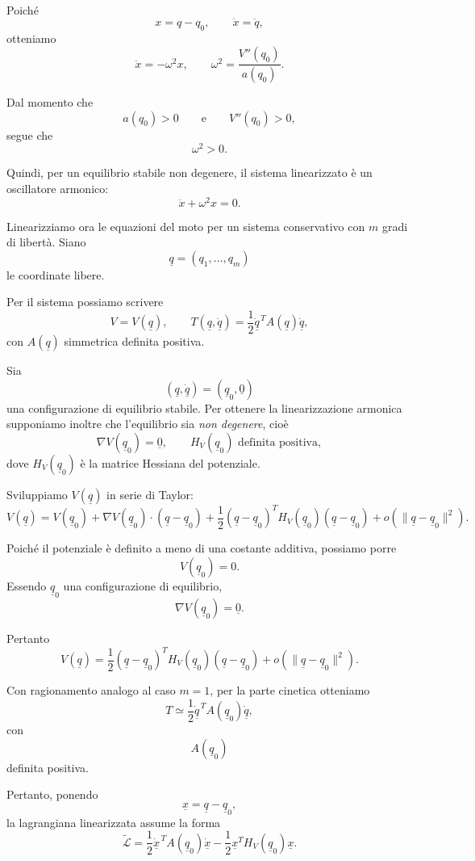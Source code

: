 Poiché
\[
x=q-q_0,
\qquad
\ddot x=\ddot q,
\]
otteniamo
\[
\ddot x=-\omega^2x,
\qquad
\omega^2=\frac{V''(q_0)}{a(q_0)}.
\]

Dal momento che
\[
a(q_0)>0
\qquad\text{e}\qquad
V''(q_0)>0,
\]
segue che
\[
\omega^2>0.
\]

Quindi, per un equilibrio stabile non degenere, il sistema linearizzato è un oscillatore armonico:
\[
\ddot x+\omega^2x=0.
\]

Linearizziamo ora le equazioni del moto per un sistema conservativo con \(m\) gradi di libertà. Siano
\[
\underline q=(q_1,\ldots,q_m)
\]
le coordinate libere.

Per il sistema possiamo scrivere
\[
V=V(\underline q),
\qquad
T(\underline q,\dot{\underline q})
=
\frac{1}{2}
\dot{\underline q}^{\,T}
A(\underline q)
\dot{\underline q},
\]
con \(A(\underline q)\) simmetrica definita positiva.

Sia
\[
(\underline q,\dot{\underline q})
=
(\underline q_0,\underline 0)
\]
una configurazione di equilibrio stabile. Per ottenere la linearizzazione armonica supponiamo inoltre che l'equilibrio sia \emph{non degenere}, cioè
\[
\nabla V(\underline q_0)=\underline 0,
\qquad
H_V(\underline q_0)\text{ definita positiva},
\]
dove \(H_V(\underline q_0)\) è la matrice Hessiana del potenziale.

Sviluppiamo \(V(\underline q)\) in serie di Taylor:
\[
V(\underline q)
=
V(\underline q_0)
+
\nabla V(\underline q_0)\cdot
(\underline q-\underline q_0)
+
\frac{1}{2}
(\underline q-\underline q_0)^T
H_V(\underline q_0)
(\underline q-\underline q_0)
+
o\!\left(
\|\underline q-\underline q_0\|^2
\right).
\]

Poiché il potenziale è definito a meno di una costante additiva, possiamo porre
\[
V(\underline q_0)=0.
\]
Essendo \(\underline q_0\) una configurazione di equilibrio,
\[
\nabla V(\underline q_0)=\underline 0.
\]

Pertanto
\[
V(\underline q)
=
\frac{1}{2}
(\underline q-\underline q_0)^T
H_V(\underline q_0)
(\underline q-\underline q_0)
+
o\!\left(
\|\underline q-\underline q_0\|^2
\right).
\]

Con ragionamento analogo al caso \(m=1\), per la parte cinetica otteniamo
\[
T
\simeq
\frac{1}{2}
\dot{\underline q}^{\,T}
A(\underline q_0)
\dot{\underline q},
\]
con
\[
A(\underline q_0)
\]
definita positiva.

Pertanto, ponendo
\[
\underline x=\underline q-\underline q_0,
\]
la lagrangiana linearizzata assume la forma
\[
\widetilde{\mathcal L}
=
\frac{1}{2}
\dot{\underline x}^{\,T}
A(\underline q_0)
\dot{\underline x}
-
\frac{1}{2}
\underline x^{T}
H_V(\underline q_0)
\underline x.
\]

